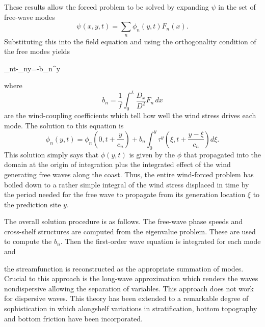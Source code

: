 These results allow the forced problem to be solved by expanding $\psi$ in the set of
free-wave modes
\[
	\psi(x,y,t)=\sum_n\phi_n(y,t)F_n(x).
\]
Substituting this into the field equation and using the orthogonality condition of the
free modes yields
\begin{waveequation}
	\phi_{nt}-\phi_{ny}=-b_n\tau^y
\end{waveequation}
where
\[
	b_n=\frac{1}{f}\int_0^L\frac{D_x}{D^2}F_n\,dx
\]
are the wind-coupling coefficients which tell how well the wind stress drives each mode.
The solution to this equation is
\[
	\phi_n(y,t)
	=\phi_n\left(0,t+\frac{y}{c_n}\right)
	+b_n\int_0^y
	\tau^y\left(\xi,t+\frac{y-\xi}{c_n}\right)d\xi.
\]
This solution simply says that $\phi(y,t)$ is given by the $\phi$ that propagated into
the domain at the origin of integration plus the integrated effect of the wind generating
free waves along the coast. Thus, the entire wind-forced problem has boiled down to a
rather simple integral of the wind stress displaced in time by the period needed for the
free wave to propagate from its generation location $\xi$ to the prediction site $y$.

The overall solution procedure is as follows. The free-wave phase speeds and cross-shelf
structures are computed from the eigenvalue problem. These are used to compute the
$b_n$. Then the first-order wave equation is integrated for each mode and

\sourcepagebreak

the streamfunction is reconstructed as the appropriate summation of modes. Crucial to
this approach is the long-wave approximation which renders the waves nondispersive
allowing the separation of variables. This approach does not work for dispersive waves.
This theory has been extended to a remarkable degree of sophistication in which
alongshelf variations in stratification, bottom topography and bottom friction have been
incorporated.
